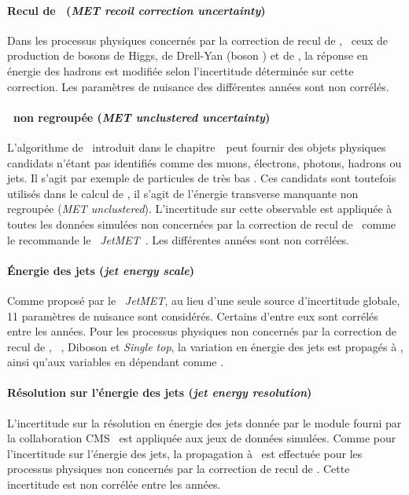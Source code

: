 \paragraph{Recul de \MET\ (\emph{MET recoil correction uncertainty})}
Dans les processus physiques concernés par la correction de recul de \MET,
\ie\ ceux de production de bosons de Higgs, de Drell-Yan (boson \Zboson) et de \Wjets,
la réponse en énergie des hadrons est modifiée selon l'incertitude déterminée sur cette correction.
Les paramètres de nuisance des différentes années sont non corrélés.
\paragraph{\MET\ non regroupée (\emph{MET unclustered uncertainty})}
L'algorithme de \PF\ introduit dans le chapitre~\ peut fournir des objets physiques candidats n'étant pas identifiés comme des muons, électrons, photons, hadrons ou jets.
Il s'agit par exemple de particules de très bas \pT.
Ces candidats sont toutefois utilisés dans le calcul de \MET, il s'agit de l'énergie transverse manquante non regroupée (\emph{MET unclustered}).
L'incertitude sur cette observable est appliquée à toutes les données simulées non concernées par la correction de recul de \MET\ comme le recommande le \POG\ \emph{JetMET}~\cite{MET_corrections}.
Les différentes années sont non corrélées.
\paragraph{Énergie des jets (\emph{jet energy scale})}
Comme proposé par le \POG\ \emph{JetMET}, au lieu d'une seule source d'incertitude globale, 11 paramètres de nuisance sont considérés.
Certains d'entre eux sont corrélés entre les années.
Pour les processus physiques non concernés par la correction de recul de \MET, \ie\ \ttbar, Diboson et \emph{Single top}, la variation en énergie des jets est propagés à \MET, ainsi qu'aux variables en dépendant comme \mTtot.
\paragraph{Résolution sur l'énergie des jets (\emph{jet energy resolution})}
L'incertitude sur la résolution en énergie des jets donnée par le module fourni par la collaboration CMS~\cite{JetResolution} est appliquée aux jeux de données simulées.
Comme pour l'incertitude sur l'énergie des jets, la propagation à \MET\ est effectuée pour les processus physiques non concernés par la correction de recul de \MET.
Cette incertitude est non corrélée entre les années.

